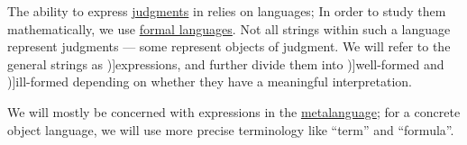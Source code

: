 \begin{concept}\label{con:expression}
  The ability to express \hyperref[con:judgment]{judgments} in relies on languages; In order to study them mathematically, we use \hyperref[def:formal_language]{formal languages}. Not all strings within such a language represent judgments --- some represent objects of judgment. We will refer to the general strings as \term[en=formal expressions (\cite[217]{Kleene2002Logic})]{expressions}, and further divide them into \term[en=well-formed (formula) (\cite[217]{Kleene2002Logic})]{well-formed} and \term[en=ill-formed (statement) (\cite[266]{Tao2022AnalysisI})]{ill-formed} depending on whether they have a meaningful interpretation.

  We will mostly be concerned with expressions in the \hyperref[con:metalogic]{metalanguage}; for a concrete object language, we will use more precise terminology like \enquote{term} and \enquote{formula}.
\end{concept}
